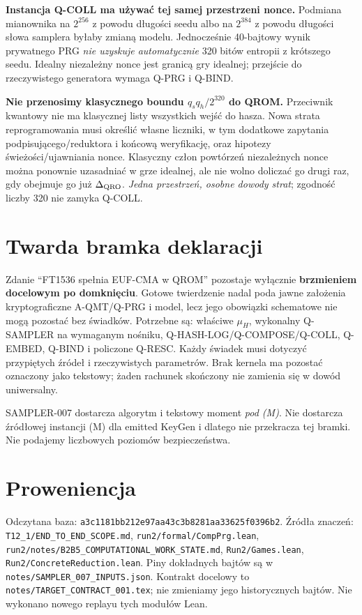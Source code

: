 \documentclass[11pt,a4paper]{article}
\newcommand{\code}[1]{\nolinkurl{#1}}
\begin{document}
\textbf{Instancja Q-COLL ma używać tej samej przestrzeni nonce.}
Podmiana mianownika na $2^{256}$ z powodu długości seedu albo na $2^{384}$
z powodu długości słowa samplera byłaby zmianą modelu.
Jednocześnie 40-bajtowy wynik prywatnego PRG \emph{nie uzyskuje automatycznie}
320 bitów entropii z krótszego seedu. Idealny niezależny nonce jest granicą
gry idealnej; przejście do rzeczywistego generatora wymaga Q-PRG i Q-BIND.

\textbf{Nie przenosimy klasycznego boundu $q_sq_h/2^{320}$ do QROM.}
Przeciwnik kwantowy nie ma klasycznej listy wszystkich wejść do hasza.
Nowa strata reprogramowania musi określić własne liczniki, w tym dodatkowe
zapytania podpisującego/reduktora i końcową weryfikację, oraz hipotezy
świeżości/ujawniania nonce. Klasyczny człon powtórzeń niezależnych nonce
można ponownie uzasadniać w grze idealnej, ale nie wolno doliczać go drugi
raz, gdy obejmuje go już $\Delta_{\rm QRO}$. \emph{Jedna przestrzeń,
osobne dowody strat}; zgodność liczby 320 nie zamyka Q-COLL.

\section{Twarda bramka deklaracji}
Zdanie ``FT1536 spełnia EUF-CMA w QROM'' pozostaje wyłącznie
\textbf{brzmieniem docelowym po domknięciu}. Gotowe twierdzenie nadal poda
jawne założenia kryptograficzne A-QMT/Q-PRG i model, lecz jego obowiązki
schematowe nie mogą pozostać bez świadków. Potrzebne są: właściwe $\mu_H$,
wykonalny Q-SAMPLER na wymaganym nośniku, Q-HASH-LOG/Q-COMPOSE/Q-COLL,
Q-EMBED, Q-BIND i policzone Q-RESC. Każdy świadek musi dotyczyć przypiętych
źródeł i rzeczywistych parametrów. Brak kernela ma pozostać oznaczony
jako tekstowy; żaden rachunek skończony nie zamienia się w dowód uniwersalny.

SAMPLER-007 dostarcza algorytm i tekstowy moment \emph{pod (M)}.
Nie dostarcza źródłowej instancji (M) dla emitted KeyGen i dlatego nie
przekracza tej bramki. Nie podajemy liczbowych poziomów bezpieczeństwa.

\appendix\section{Proweniencja}
Odczytana baza: \code{a3c1181bb212e97aa43c3b8281aa33625f0396b2}.
Źródła znaczeń: \code{T12_1/END_TO_END_SCOPE.md},
\code{run2/formal/CompPrg.lean}, \code{run2/notes/B2B5_COMPUTATIONAL_WORK_STATE.md},
\code{Run2/Games.lean}, \code{Run2/ConcreteReduction.lean}.
Piny dokładnych bajtów są w \code{notes/SAMPLER_007_INPUTS.json}.
Kontrakt docelowy to \code{notes/TARGET_CONTRACT_001.tex}; nie zmieniamy
jego historycznych bajtów. Nie wykonano nowego replayu tych modułów Lean.
\end{document}
